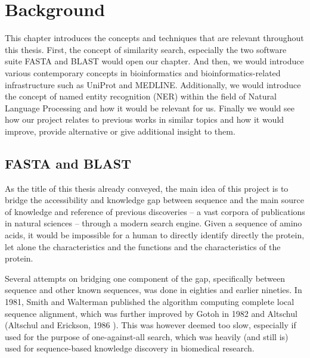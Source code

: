 
\chapter{Background} %

\label{Chapter2} %


This chapter introduces the concepts and techniques that are relevant throughout this thesis. First, the concept of similarity search, especially the two software suite FASTA and BLAST would open our chapter. And then, we would introduce various contemporary concepts in bioinformatics and bioinformatics-related infrastructure such as UniProt and MEDLINE. Additionally, we would introduce the concept of named entity recognition (NER) within the field of Natural Language Processing and how it would be relevant for us. Finally we would see how our project relates to previous works in similar topics and how it would improve, provide alternative or give additional insight to them.


\section{FASTA and BLAST}

As the title of this thesis already conveyed, the main idea of this project is to bridge the accessibility and knowledge gap between sequence and the main source of knowledge and reference of previous discoveries -- a vast corpora of publications in natural sciences -- through a modern search engine. Given a sequence of amino acids, it would be impossible for a human to directly identify directly the protein, let alone the characteristics and the functions and the characteristics of the protein.

Several attempts on bridging one component of the gap, specifically between sequence and other known sequences, was done in eighties and earlier nineties. In 1981, Smith and Walterman published the algorithm computing complete local sequence alignment, which was further improved by Gotoh in 1982 \citep{gotoh1982improved} and Altschul (Altschul and Erickson, 1986 \citep{altschul1986optimal}). This was however deemed too slow, especially if used for the purpose of one-against-all search, which was heavily (and still is) used for sequence-based knowledge discovery in biomedical research.


